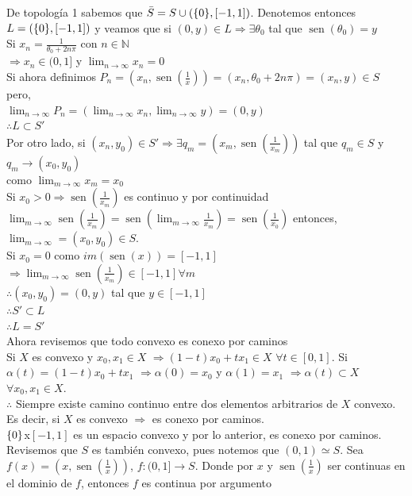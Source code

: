 \documentclass[11pt,a4paper,oneside]{report}
\theoremstyle{definition}
\theoremstyle{plain}
\theoremstyle{remark}
\newcommand{\N}{\mathbb{N}}
\DeclarePairedDelimiter{\conj}{\{}{\}}
\DeclareMathOperator{\sen}{sen}
\begin{document}
De topología 1 sabemos que $\bar{S}=S \cup (\conj{0},[-1,1])$. Denotemos entonces $L=(\conj{0},[-1,1])$ y veamos
que si $(0,y) \in L \Rightarrow \exists \theta_0$ tal que $\sen(\theta_0)=y$\\
Si $x_n=\frac{1}{\theta_0 +2n\pi}$ con $n\in\N$\\
$\Rightarrow x_n \in (0,1]$ y $\lim_{n\rightarrow \infty} x_n=0$\\
Si ahora definimos $P_n=(x_n,\sen(\frac{1}{x}))=(x_n,\theta_0 +2n\pi)=(x_n,y)\in S$ pero, \\
$\lim_{n\rightarrow \infty} P_n=(\lim_{n\rightarrow \infty} x_n, \lim_{n\rightarrow \infty} y)=(0,y)$\\
$\therefore L \subset S'$\\
Por otro lado,
si $(x_n,y_0)\in S'\Rightarrow \exists q_m=(x_m,\sen(\frac{1}{x_m}))$ tal que $q_m\in S$ y 
$q_m \rightarrow (x_0,y_0)$\\
como $\lim_{m\rightarrow \infty} x_m=x_0$  \\
Si $x_0>0 \Rightarrow \sen(\frac{1}{x_m})$ es continuo y por continuidad
$\lim_{m\rightarrow \infty} \sen(\frac{1}{x_m})=\sen(\lim_{m\rightarrow \infty}\frac{1}{x_m})=\sen(\frac{1}{x_0})$
entonces, $\lim_{m\rightarrow \infty}=(x_0,y_0)\in S$. \\
Si $x_0=0$ como $im(\sen(x))=[-1,1]$ $\Rightarrow \lim_{m\rightarrow \infty} \sen(\frac{1}{x_m}) \in[-1,1] \forall m$ \\
$\therefore (x_0,y_0)=(0,y)$ tal que $y\in[-1,1]$\\
$\therefore S' \subset L$\\
$\therefore L = S'$\\
Ahora revisemos que todo convexo es conexo por caminos\\
Si $X$ es convexo y $x_0,x_1 \in X$ $\Rightarrow (1-t)x_0 + tx_1 \in X$ $\forall t \in [0,1]$.
Si $\alpha(t)=(1-t)x_0 + tx_1$ $\Rightarrow \alpha(0)=x_0$ y $\alpha(1)=x_1$ $\Rightarrow \alpha(t) \subset X$
$\forall x_0,x_1 \in X$.\\
$\therefore$ Siempre existe camino continuo entre dos elementos arbitrarios de $X$ convexo. Es decir, si $X$ es convexo 
$\Rightarrow$ es conexo por caminos.\\
$\conj{0}$x$[-1,1]$ es un espacio convexo y por lo anterior, es conexo por caminos.\\
Revisemos que $S$ es también convexo, pues notemos que $(0,1) \simeq S$. Sea $f(x)=(x,\sen(\frac{1}{x}))$, $f:(0,1] \rightarrow S$.
Donde por $x$ y $\sen(\frac{1}{x})$ ser continuas en el dominio de $f$, entonces $f$ es continua por argumento
\end{document}

